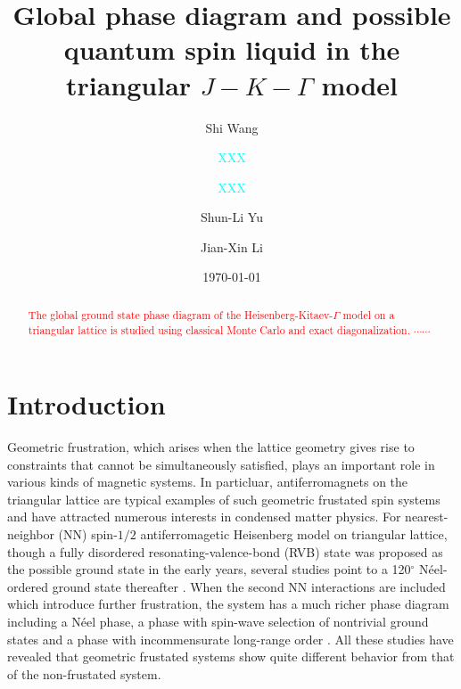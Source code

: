 \documentclass[aps,prb,reprint,amsfonts,amsmath,amssymb,showpacs,groupedaddress,superscriptaddress]{revtex4-1}
\begin{document}
\title{Global phase diagram and possible quantum spin liquid in the triangular $J-K-\Gamma$ model}

\author{Shi Wang}

\author{\textcolor{cyan}{XXX}}
\affiliation{\textcolor{cyan}{XXX}}
\author{\textcolor{cyan}{XXX}}
\affiliation{\textcolor{cyan}{XXX}}

\author{Shun-Li Yu}
\author{Jian-Xin Li}

\date{\today}

\begin{abstract}
\textcolor{red}{The global ground state phase diagram of the Heisenberg-Kitaev-$\Gamma$ model on a triangular lattice is studied using classical Monte Carlo and exact diagonalization. $\cdots \cdots$}
\end{abstract}

\maketitle

\section{Introduction}
Geometric frustration, which arises when the lattice geometry gives rise to constraints that cannot be simultaneously satisfied, plays an important role in various kinds of magnetic systems. In particluar, antiferromagnets on the triangular lattice are typical examples of such geometric frustated spin systems and have attracted numerous interests in condensed matter physics. For nearest-neighbor (NN) spin-$1/2$ antiferromagetic Heisenberg model on triangular lattice, though a fully disordered resonating-valence-bond (RVB) \cite{Anderson1973} state was proposed as the possible ground state in the early years, several studies point to a 120$^\circ$ N\'{e}el-ordered ground state thereafter \cite{PhysRevLett.99.127004,PhysRevLett.82.3899,PhysRevB.50.10048,PhysRevLett.60.2531}. When the second NN interactions are included which introduce further frustration, the system has a much richer phase diagram including a N\'{e}el phase, a phase with spin-wave selection of nontrivial ground states and a phase with incommensurate long-range order \cite{PhysRevB.42.4800,PhysRevB.46.11137}. All these studies have revealed that geometric frustated systems show quite different behavior from that of the non-frustated system.
\end{document}
